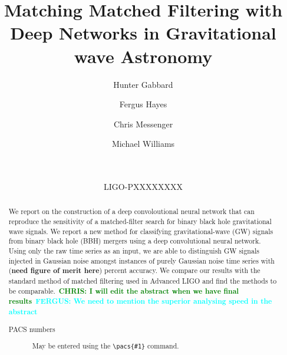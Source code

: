 \documentclass[%
 amsmath,amssymb,
 aps,
 twocolumn,
 prl,
 reprint,
floatfix,
]{revtex4-1}
\newcommand{\dcc}{LIGO-PXXXXXXXX}
\newcommand{\chris}[1]{\textbf{\textcolor{green}{CHRIS: #1}}}
\newcommand{\fergus}[1]{\textbf{\textcolor{cyan}{FERGUS: #1}}}
\begin{document}

%
%
\title{Matching Matched Filtering with Deep Networks in Gravitational wave Astronomy}

\author{Hunter Gabbard}
\author{Fergus Hayes}
\author{Chris Messenger}
\author{Michael Williams}


\date{\commitDATE\\\mbox{\small \commitID}\\\mbox{\dcc}}

%
%
\begin{abstract} 
%
We report on the construction of a deep convoloutional neural network that can
reproduce the sensitivity of a matched-filter search for binary black hole
gravitational wave signals. We report a new method for classifying
gravitational-wave (GW) signals from binary black hole (BBH) mergers using a
deep convolutional neural network. Using only the raw time series as an input,
we are able to distinguish GW signals injected in Gaussian noise amongst
instances of purely Gaussian noise time series with (\textbf{need figure of
merit here}) percent accuracy.  We compare our results with the standard method
of matched filtering used in Advanced LIGO and find the methods to be
comparable.~\chris{I will edit the abstract when we have final results}~\fergus{We need to mention the superior analysing speed in the abstract}
\begin{description} \item[PACS numbers] May be entered using the
\verb+\pacs{#1}+ command.  
\end{description} 
%
\end{abstract}

\end{document}
